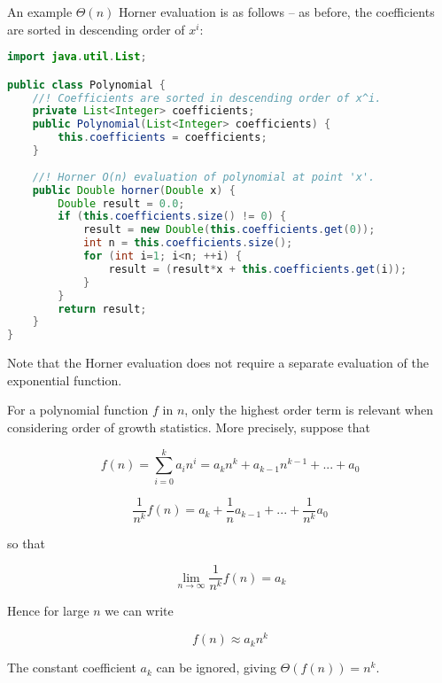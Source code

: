 \documentclass[a4paper,12pt]{article}
\begin{document}
An example $\Theta(n)$ Horner evaluation is as follows -- as before, the 
coefficients are sorted in descending order of $x^i$:

\newpage
\begin{lstlisting}[language=Java]
import java.util.List;

public class Polynomial {
    //! Coefficients are sorted in descending order of x^i.
    private List<Integer> coefficients;
    public Polynomial(List<Integer> coefficients) {
        this.coefficients = coefficients;
    }
    
    //! Horner O(n) evaluation of polynomial at point 'x'.
    public Double horner(Double x) {
        Double result = 0.0;
        if (this.coefficients.size() != 0) {
            result = new Double(this.coefficients.get(0));
            int n = this.coefficients.size();
            for (int i=1; i<n; ++i) {
                result = (result*x + this.coefficients.get(i));
            }
        }
        return result;
    }
}    
\end{lstlisting}

Note that the Horner evaluation does not require a separate evaluation of the exponential function.

\vspace{5mm}


For a polynomial function $f$ in $n$, only the highest order term is relevant when considering order of growth statistics. More precisely, suppose that 

\[ f(n) = \sum_{i=0}^k a_in^i = a_kn^k + a_{k-1}n^{k-1} + ... + a_0 \]

\[ \frac{1}{n^k} f(n) = a_k + \frac{1}{n} a_{k-1} + ...  + \frac{1}{n^k}a_0  \]

so that

\[ \lim_{n \rightarrow \infty} \frac{1}{n^k}f(n) = a_k \]

Hence for large $n$ we can write

\[ f(n) \approx a_k n^k \]

The constant coefficient $a_k$ can be ignored, giving $\Theta(f(n)) = n^k$.
\end{document}
